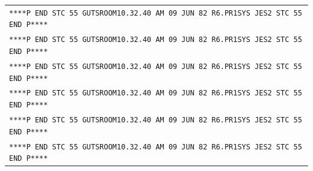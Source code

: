 \begin{tabular}{l}
\texttt{****P END STC 55 GUTS}\quad\texttt{ROOM}\quad\texttt{10.32.40 AM 09 JUN 82 R6.PR1}\quad\texttt{SYS JES2 STC 55 END P****}\\
\texttt{****P END STC 55 GUTS}\quad\texttt{ROOM}\quad\texttt{10.32.40 AM 09 JUN 82 R6.PR1}\quad\texttt{SYS JES2 STC 55 END P****}\\
\texttt{****P END STC 55 GUTS}\quad\texttt{ROOM}\quad\texttt{10.32.40 AM 09 JUN 82 R6.PR1}\quad\texttt{SYS JES2 STC 55 END P****}\\
\texttt{****P END STC 55 GUTS}\quad\texttt{ROOM}\quad\texttt{10.32.40 AM 09 JUN 82 R6.PR1}\quad\texttt{SYS JES2 STC 55 END P****}\\
\texttt{****P END STC 55 GUTS}\quad\texttt{ROOM}\quad\texttt{10.32.40 AM 09 JUN 82 R6.PR1}\quad\texttt{SYS JES2 STC 55 END P****}\\
\texttt{****P END STC 55 GUTS}\quad\texttt{ROOM}\quad\texttt{10.32.40 AM 09 JUN 82 R6.PR1}\quad\texttt{SYS JES2 STC 55 END P****}
\end{tabular}

